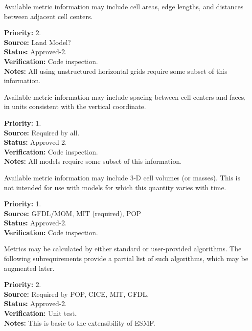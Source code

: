 Available metric information may include cell areas, edge lengths, and distances between
adjacent cell centers.
\begin{reqlist}
{\bf Priority:} 2. \\
{\bf Source:} Land Model? \\
{\bf Status:} Approved-2. \\
{\bf Verification:} Code inspection. \\
{\bf Notes:} All using unstructured horizontal grids require some subset of this
information.
\end{reqlist}

Available metric information may include spacing between cell centers and faces, in
units consistent with the vertical coordinate.
\begin{reqlist}
{\bf Priority:} 1. \\
{\bf Source:} Required by all. \\
{\bf Status:} Approved-2. \\
{\bf Verification:} Code inspection. \\
{\bf Notes:} All models require some subset of this information.
\end{reqlist}

Available metric information may include 3-D cell volumes (or masses).  This is not
intended for use with models for which this quantity varies with time.
\begin{reqlist}
{\bf Priority:} 1. \\
{\bf Source:} GFDL/MOM, MIT (required), POP \\
{\bf Status:} Approved-2. \\
{\bf Verification:} Code inspection.
\end{reqlist}

Metrics may be calculated by either standard or user-provided algorithms.
The following subrequirements provide a partial list of such algorithms,
which may be augmented later.
\begin{reqlist}
{\bf Priority:} 2. \\
{\bf Source:} Required by POP, CICE, MIT, GFDL. \\
{\bf Status:} Approved-2. \\
{\bf Verification:} Unit test. \\
{\bf Notes:} This is basic to the extensibility of ESMF. 
\end{reqlist}

